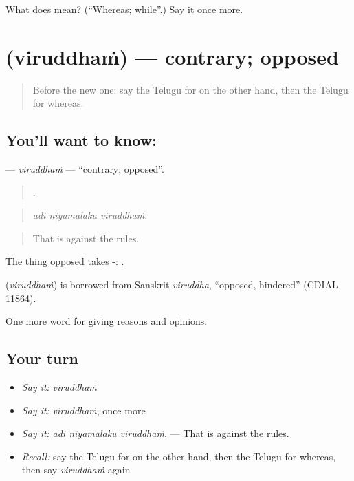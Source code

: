 \begin{tcolorbox}[breakable,colback=teal!4,colframe=teal!35!black,title={Before you move on}]
What does  mean? (\textquotedblleft{}Whereas; while\textquotedblright{}.) Say it once more.
\end{tcolorbox}
\section[\texorpdfstring{\te{విరుద్ధం} (viruddhaṁ)}{విరుద్ధం (viruddhaṁ)}]{ (viruddhaṁ) — contrary; opposed}

\label{lesson:TE-C396-viruddham}



\begin{quote}
Before the new one: say the Telugu for on the other hand, then the Telugu for whereas.
\end{quote}

\subsection*{You'll want to know: }
\textbf{} — \emph{viruddhaṁ} — \textquotedblleft{}contrary; opposed\textquotedblright{}.

\begin{quote}
  .
\end{quote}

\begin{quote}
\emph{adi niyamālaku viruddhaṁ.}
\end{quote}

\begin{quote}
That is against the rules.
\end{quote}

The thing opposed takes -:  .

\begin{cousinweb}
\textbf{} (\emph{viruddhaṁ}) is borrowed from Sanskrit \emph{viruddha}, \textquotedblleft{}opposed, hindered\textquotedblright{} (CDIAL 11864).
\end{cousinweb}

\begin{grammarlens}[title={What you've built}]
One more word for giving reasons and opinions.
\end{grammarlens}

\subsection*{Your turn}
\begin{itemize}
\raggedright
  \item \emph{Say it:} \emph{viruddhaṁ}
  \item \emph{Say it:} \emph{viruddhaṁ}, once more
  \item \emph{Say it:} \emph{adi niyamālaku viruddhaṁ.} — That is against the rules.
  \item \emph{Recall:} say the Telugu for on the other hand, then the Telugu for whereas, then say \emph{viruddhaṁ} again
\end{itemize}

